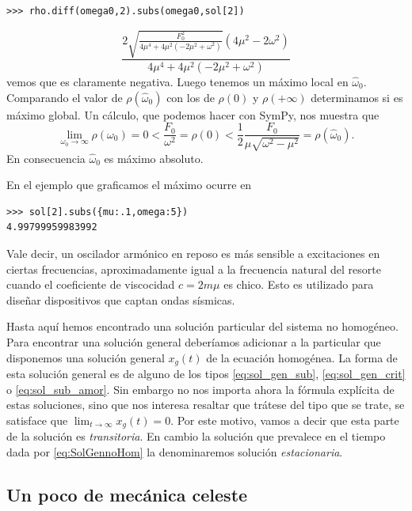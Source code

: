 \begin{lstlisting}
>>> rho.diff(omega0,2).subs(omega0,sol[2])
\end{lstlisting}
\[
\frac{2 \sqrt{\frac{F_{0}^{2}}{4 \mu^{4} + 4 \mu^{2} \left(- 2 \mu^{2} + \omega^{2}\right)}} \left(4 \mu^{2} - 2 \omega^{2}\right)}{4 \mu^{4} + 4 \mu^{2} \left(- 2 \mu^{2} + \omega^{2}\right)}
\]
vemos que es claramente negativa. Luego tenemos un máximo local en $\hat{\omega}_0$. Comparando el valor de $\rho(\hat{\omega}_0)$ con los de $\rho(0)$ y $\rho(+\infty)$ determinamos si es máximo global. Un cálculo, que podemos hacer con SymPy, nos muestra que
\[\lim_{\omega_0\to\infty}\rho(\omega_0)=0<\frac{F_0}{\omega^2}=\rho(0)< \frac12\frac{F_0}{\mu\sqrt{\omega^2-\mu^2}}=\rho(\hat{\omega}_0).\]
En consecuencia $\hat{\omega}_0$ es máximo absoluto.



En el ejemplo que graficamos
el máximo ocurre en
\begin{lstlisting}
>>> sol[2].subs({mu:.1,omega:5})
4.99799959983992
\end{lstlisting}

Vale decir, un oscilador armónico en reposo es más sensible a excitaciones en ciertas frecuencias, aproximadamente igual a la frecuencia
natural del resorte cuando el coeficiente de viscocidad $c=2m\mu$ es chico. Esto es utilizado para diseñar dispositivos que captan ondas sísmicas.


Hasta aquí hemos encontrado una solución particular del sistema no homogéneo. Para encontrar una solución general deberíamos adicionar a la particular que disponemos
una solución general $x_g(t)$ de la ecuación homogénea. La forma de esta solución general es de alguno de los tipos \ref{eq:sol_gen_sub},
\ref{eq:sol_gen_crit} o \ref{eq:sol_sub_amor}. Sin embargo no nos importa ahora la fórmula explícita de estas soluciones, sino que nos interesa resaltar que
trátese del tipo que se trate, se satisface que $\lim_{t\to\infty}x_g(t)=0$. Por este motivo, vamos a decir que esta parte de la solución es
\emph{transitoria}. En cambio la solución que prevalece en el tiempo dada por \eqref{eq:SolGennoHom} la denominaremos solución \emph{estacionaria}.

\subsection{Un poco de mecánica celeste}

